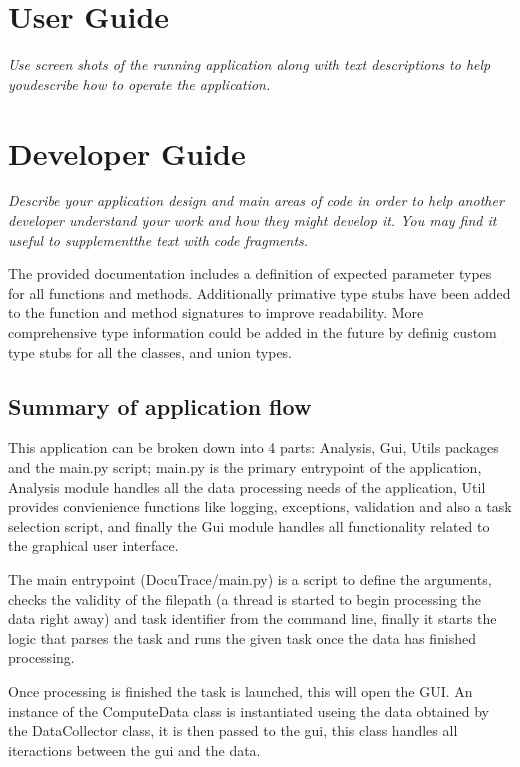 \documentclass[11pt]{article}
\begin{document}
\section{User Guide}
\emph{Use screen shots of the running application along with text descriptions to help youdescribe how to operate the application.}

\section{Developer Guide}
\emph{Describe your application design and main areas of code in order to help another developer understand your work and how they might develop it. You may find it useful to supplementthe text with code fragments.}

The provided documentation includes a definition of expected parameter types for all functions and methods. 
Additionally primative type stubs have been added to the function and method signatures to improve readability.
More comprehensive type information could be added in the future by definig custom type stubs for all the classes, and union types.


\subsection{Summary of application flow}
This application can be broken down into 4 parts: Analysis, Gui, Utils packages and the main.py script; 
main.py is the primary entrypoint of the application, Analysis module handles all the data processing needs of the application, Util provides convienience functions like logging, exceptions, validation and also a task selection script, and finally the Gui module handles all functionality related to the graphical user interface. 

The main entrypoint (DocuTrace/main.py) is a script to define the arguments, checks the validity of the filepath (a thread is started to begin processing the data right away) and task identifier from the command line, finally it starts the logic that parses the task and runs the given task once the data has finished processing.

Once processing is finished the task is launched, this will open the GUI. 
An instance of the ComputeData class is instantiated useing the data obtained by the DataCollector class, it is then passed to the gui, this class handles all iteractions between the gui and the data.
\end{document}
